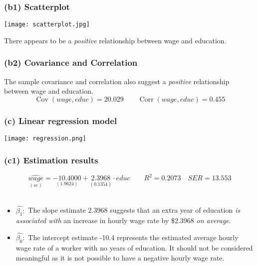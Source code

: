 \documentclass[11pt, xcolor=x11names,compress]{beamer}
\DeclareMathOperator{\Cov}{\text{Cov}}
\DeclareMathOperator{\Corr}{\text{Corr}}
\begin{document}
\begin{frame}[fragile,t]
\frametitle{(b1) Scatterplot}
\begin{center}
\texttt{[image: scatterplot.jpg]} 
\end{center}
\item There appears to be a \textit{positive} relationship between wage and education.
\hyperlink{association}{}
\end{frame}

\begin{frame}[fragile,t]
\frametitle{(b2) Covariance and Correlation}

\vspace{15mm}

The sample covariance and correlation also suggest a \textit{positive} relationship between wage and education.
$$\Cov(wage,educ) = 20.029 \qquad \Corr(wage,educ)=0.455$$
\hyperlink{association}{}
\end{frame}

\begin{frame}[fragile,t]
\frametitle{(c) Linear regression model}
\begin{center}
    \texttt{[image: regression.png]}
\end{center}
\end{frame}

\begin{frame}[fragile,t]
\frametitle{(c1) Estimation results}
$$\underset{(se)}{\widehat{wage}} = \underset{(1.9624)}{-10.4000} +  \underset{(0.1354)}{2.3968} \cdot educ \qquad R^2=0.2073 \quad SER=13.553$$ \\
\begin{itemize}
    \item $\hat{\beta_1}:$ The slope estimate 2.3968 suggests that an extra year of education \textit{is associated with} an increase in hourly wage rate by \$2.3968 \textit{on average}.  \\
    \vspace{3mm}
    \item $\hat{\beta_0}:$  The intercept estimate -10.4 represents the estimated average hourly wage rate of a worker with no years of education. It should not be considered meaningful as it is not possible to have a negative hourly wage rate. \\
\end{itemize}
\end{frame}
\end{document}
